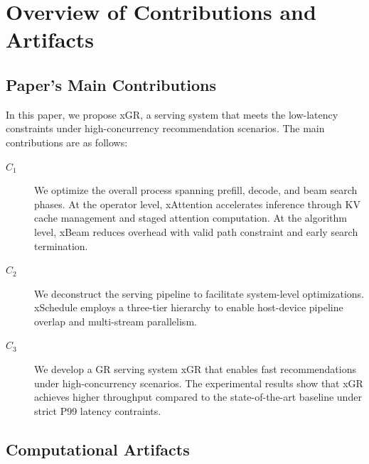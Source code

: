 \documentclass[conference]{IEEEtran}
\begin{document}


\appendixAD

\section{Overview of Contributions and Artifacts}

\subsection{Paper's Main Contributions}

In this paper, we propose xGR, a serving system that meets the low-latency constraints under high-concurrency recommendation scenarios. The main contributions are as follows:

\begin{description}
\item[$C_1$] We optimize the overall process spanning prefill, decode, and beam search phases. At the operator level, xAttention accelerates inference through KV cache management and staged attention computation. At the algorithm level, xBeam reduces overhead with valid path constraint and early search termination.
\item[$C_2$] We deconstruct the serving pipeline to facilitate system-level optimizations. xSchedule employs a three-tier hierarchy to enable host-device pipeline overlap and multi-stream parallelism.
\item[$C_3$] We develop a GR serving system xGR that enables fast recommendations under high-concurrency scenarios. The experimental results show that xGR achieves higher throughput compared to the state-of-the-art baseline under strict P99 latency contraints.
\end{description}


\subsection{Computational Artifacts}

\end{document}
